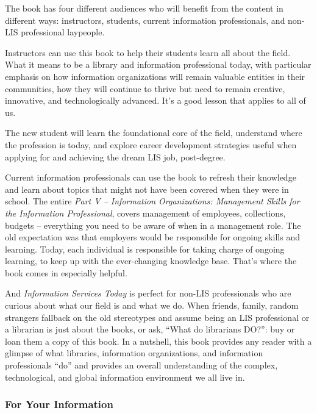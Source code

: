 \documentclass[a4paper,
fontsize=11pt,
oneside,
numbers=noperiodatend,
parskip=half-,
bibliography=totoc,
final
]{scrartcl}
\begin{document}
The book has four different audiences who will benefit from the content
in different ways: instructors, students, current information
professionals, and non-LIS professional laypeople.

Instructors can use this book to help their students learn all about the
field. What it means to be a library and information professional today,
with particular emphasis on how information organizations will remain
valuable entities in their communities, how they will continue to thrive
but need to remain creative, innovative, and technologically advanced.
It's a good lesson that applies to all of us.

The new student will learn the foundational core of the field,
understand where the profession is today, and explore career development
strategies useful when applying for and achieving the dream LIS job,
post-degree.

Current information professionals can use the book to refresh their
knowledge and learn about topics that might not have been covered when
they were in school. The entire \emph{Part V -- Information
Organizations: Management Skills for the Information Professional},
covers management of employees, collections, budgets -- everything you
need to be aware of when in a management role. The old expectation was
that employers would be responsible for ongoing skills and learning.
Today, each individual is responsible for taking charge of ongoing
learning, to keep up with the ever-changing knowledge base. That's where
the book comes in especially helpful.

And \emph{Information Services Today} is perfect for non-LIS
professionals who are curious about what our field is and what we do.
When friends, family, random strangers fallback on the old stereotypes
and assume being an LIS professional or a librarian is just about the
books, or ask, \enquote{What do librarians DO?}: buy or loan them a copy
of this book. In a nutshell, this book provides any reader with a
glimpse of what libraries, information organizations, and information
professionals \enquote{do} and provides an overall understanding of the
complex, technological, and global information environment we all live
in.

\subsubsection{For Your Information}\label{for-your-information}
\end{document}
